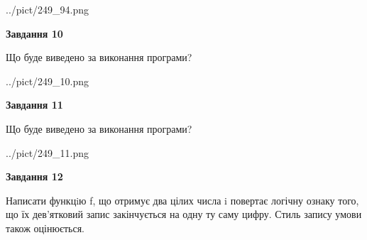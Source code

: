 \documentclass[12pt, ukrainian]{article}
\begin{document}
{\begin {large}
\begin{center}
	{../pict/249_94.png}
\end{center}
\newpage

{\begin {center}\textbf{Завдання 10}\end {center}}

Що буде виведено за виконання програми?\par
\begin{center}
	{../pict/249_10.png}
\end{center}
\newpage

{\begin {center}\textbf{Завдання 11}\end {center}}

Що буде виведено за виконання програми?\par
\begin{center}
	{../pict/249_11.png}
\end{center}
\newpage

{\begin {center}\textbf{Завдання 12}\end {center}}


Написати функцiю f, що отримує два цілих числа i повертає логічну ознаку того, що їх дев'ятковий запис закінчується на одну ту саму цифру. Стиль запису умови також оцінюється.\par
\newpage

\end {large}}
\end{document}
